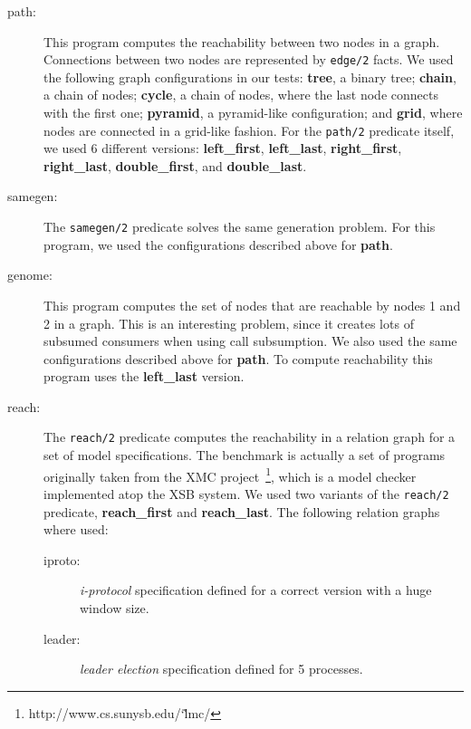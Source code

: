 \begin{description}
   
   \item[path:] This program computes the reachability between two nodes in a graph.
   Connections between two nodes are represented by \texttt{edge/2} facts.
   We used the following graph configurations in our tests: \textbf{tree}, a
   binary tree; \textbf{chain}, a chain of nodes; \textbf{cycle}, a chain of nodes, where the
   last node connects with the first one; \textbf{pyramid}, a pyramid-like configuration;
   and \textbf{grid}, where nodes are connected in a grid-like fashion.
   For the \texttt{path/2} predicate itself, we used 6 different versions: \textbf{left\_first},
   \textbf{left\_last}, \textbf{right\_first}, \textbf{right\_last},
   \textbf{double\_first}, and \textbf{double\_last}.
    
   \item[samegen:] The \texttt{samegen/2} predicate solves the same generation problem.
   For this program, we used the configurations described above for \textbf{path}.
   
   \item[genome:] This program computes the set of nodes that are reachable by nodes 1 and 2 in a graph.
   This is an interesting problem, since it creates lots of subsumed consumers when using
   call subsumption. We also used the same configurations described above for \textbf{path}.
   To compute reachability this program uses the \textbf{left\_last} version.
   
   \item[reach:] The \texttt{reach/2} predicate computes the reachability in a relation graph for a set of
   model specifications. The benchmark is actually a set of programs originally taken from the
   XMC project~\cite{RamakrishnanCR-00}\footnote{http://www.cs.sunysb.edu/\char`\~lmc/}, which is a model checker implemented
   atop the XSB system. We used two variants of the \texttt{reach/2} predicate,
   \textbf{reach\_first} and \textbf{reach\_last}.
   The following relation graphs where used:
   
      \begin{description}
         
         \item[iproto:] \emph{i-protocol} specification defined for a correct version with a huge window size.
         
         \item[leader:] \emph{leader election} specification defined for 5 processes.
         

\end{description}
\end{description}
